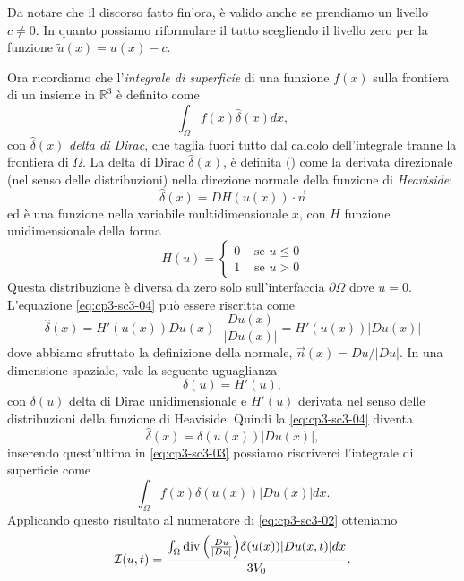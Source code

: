 \begin{osservazione}
  \label{oss:cp3-sc3-01}
Da notare che il discorso fatto fin'ora, è valido anche se prendiamo
un livello $c\ne 0$. In quanto possiamo riformulare il tutto
scegliendo il livello zero per la funzione  $\tilde{u}(x)=u(x)-c$.
\end{osservazione}
Ora ricordiamo che l'\emph{integrale di superficie} di una funzione
$f(x)$ sulla frontiera di un insieme in $\mathbb{R}^3$ è definito come \cite[vedi][§1.5]{osher:fed}
\begin{equation}
  \label{eq:cp3-sc3-03}
  \int_{\Omega}f(x)\hat{\delta}(x)dx,
\end{equation}
con $\hat{\delta}(x)$  \emph{delta di Dirac}, che taglia
fuori tutto dal calcolo dell'integrale tranne la frontiera di
$\Omega$. La delta di Dirac $\hat{\delta}(x)$, è definita
(\cite[vedi][§1.5]{osher:fed}) come la
derivata direzionale (nel senso delle distribuzioni) nella direzione normale della funzione di \emph{Heaviside}:
\begin{equation}
  \label{eq:cp3-sc3-04}
  \hat{\delta}(x)=DH(u(x))\cdot\vec{n}
\end{equation}
ed è una funzione nella variabile multidimensionale $x$, con $H$
funzione unidimensionale della forma 
\[
H(u)=
\begin{cases}
  0 &\text{ se $u\leq 0$} \\
  1 &\text{ se $u>0$}
\end{cases}
\]
Questa distribuzione è diversa da zero solo sull'interfaccia $\partial\Omega$
dove $u=0$. L'equazione \eqref{eq:cp3-sc3-04} può essere riscritta come
\[
\hat{\delta}(x) = H'(u(x))Du(x)\cdot\frac{Du(x)}{|Du(x)|}=H'(u(x))|Du(x)|
\]
dove abbiamo sfruttato la definizione della normale,
$\vec{n}(x)=Du/|Du|$. In una dimensione spaziale, vale la seguente uguaglianza
\[
\delta(u)=H'(u),
\]
con $\delta(u)$ delta di Dirac unidimensionale e $H'(u)$ derivata nel
senso delle distribuzioni della funzione di Heaviside.
Quindi la \eqref{eq:cp3-sc3-04} diventa
\begin{equation}
  \label{eq:cp3-sc3-05}
  \hat{\delta}(x)=\delta(u(x))|Du(x)|,
\end{equation}
inserendo quest'ultima in \eqref{eq:cp3-sc3-03} possiamo riscriverci l'integrale di superficie come 
\begin{equation}
  \label{eq:cp3-sc3-06}
  \int_{\Omega}f(x)\delta(u(x))|Du(x)|dx.
\end{equation}
Applicando questo risultato al numeratore di \eqref{eq:cp3-sc3-02}
otteniamo
\begin{equation}
  \label{eq:cp3-sc3-07}
\mathcal{I}(u,t) = \frac{\int_{\Omega}\operatorname{div}{\left(\frac{Du}{|Du|}\right)}\delta(u(x))|Du(x,t)|dx}{3V_0}.
\end{equation}
